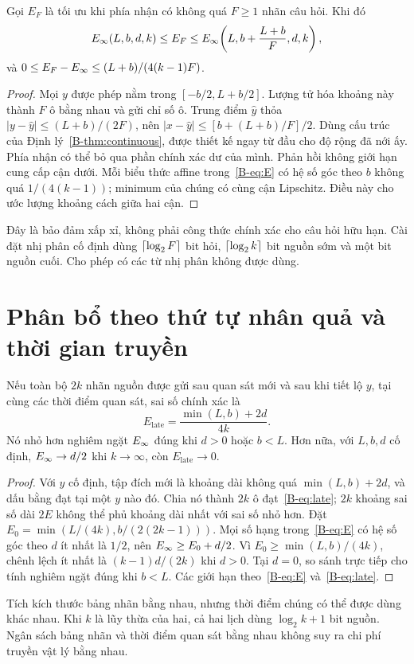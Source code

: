 \begin{proposition}\label{B-prop:finitequery}
Gọi $E_F$ là tối ưu khi phía nhận có không quá $F\geq1$ nhãn câu hỏi. Khi đó
\begin{equation}\label{B-eq:finitequery}
E_{\infty}(L,b,d,k)\leq E_F\leq E_{\infty}\!\left(L,b+\frac{L+b}{F},d,k\right),
\end{equation}
và $0\leq E_F-E_{\infty}\leq(L+b)/(4(k-1)F)$.
\end{proposition}
\begin{proof}
Mọi $y$ được phép nằm trong $[-b/2,L+b/2]$. Lượng tử hóa khoảng này thành $F$ ô bằng nhau và gửi chỉ số ô. Trung điểm $\widehat y$ thỏa $|y-\widehat y|\leq(L+b)/(2F)$, nên $|x-\widehat y|\leq[b+(L+b)/F]/2$. Dùng cấu trúc của Định lý~\ref{B-thm:continuous}, được thiết kế ngay từ đầu cho độ rộng đã nới ấy. Phía nhận có thể bỏ qua phần chính xác dư của mình. Phản hồi không giới hạn cung cấp cận dưới. Mỗi biểu thức affine trong~\eqref{B-eq:E} có hệ số góc theo $b$ không quá $1/(4(k-1))$; minimum của chúng có cùng cận Lipschitz. Điều này cho ước lượng khoảng cách giữa hai cận.
\end{proof}
Đây là bảo đảm xấp xỉ, không phải công thức chính xác cho câu hỏi hữu hạn. Cài đặt nhị phân cố định dùng $\left\lceil \log_2F\right\rceil$ bit hỏi, $\left\lceil \log_2k\right\rceil$ bit nguồn sớm và một bit nguồn cuối. Cho phép có các từ nhị phân không được dùng.

\section{Phân bổ theo thứ tự nhân quả và thời gian truyền}
\begin{corollary}\label{B-cor:late}
Nếu toàn bộ $2k$ nhãn nguồn được gửi sau quan sát mới và sau khi tiết lộ $y$, tại cùng các thời điểm quan sát, sai số chính xác là
\begin{equation}\label{B-eq:late}
E_{\mathrm{late}}=\frac{\min(L,b)+2d}{4k}.
\end{equation}
Nó nhỏ hơn nghiêm ngặt $E_{\infty}$ đúng khi $d>0$ hoặc $b<L$. Hơn nữa, với $L,b,d$ cố định, $E_{\infty}\to d/2$ khi $k\to\infty$, còn $E_{\mathrm{late}}\to0$.
\end{corollary}
\begin{proof}
Với $y$ cố định, tập đích mới là khoảng dài không quá $\min(L,b)+2d$, và dấu bằng đạt tại một $y$ nào đó. Chia nó thành $2k$ ô đạt~\eqref{B-eq:late}; $2k$ khoảng sai số dài $2E$ không thể phủ khoảng dài nhất với sai số nhỏ hơn. Đặt $E_0=\min(L/(4k),b/(2(2k-1)))$. Mọi số hạng trong~\eqref{B-eq:E} có hệ số góc theo $d$ ít nhất là $1/2$, nên $E_{\infty}\geq E_0+d/2$. Vì $E_0\geq\min(L,b)/(4k)$, chênh lệch ít nhất là $(k-1)d/(2k)$ khi $d>0$. Tại $d=0$, so sánh trực tiếp cho tính nghiêm ngặt đúng khi $b<L$. Các giới hạn theo~\eqref{B-eq:E} và~\eqref{B-eq:late}.
\end{proof}
Tích kích thước bảng nhãn bằng nhau, nhưng thời điểm chúng có thể được dùng khác nhau. Khi $k$ là lũy thừa của hai, cả hai lịch dùng $\log_2k+1$ bit nguồn. Ngân sách bảng nhãn và thời điểm quan sát bằng nhau không suy ra chi phí truyền vật lý bằng nhau.

